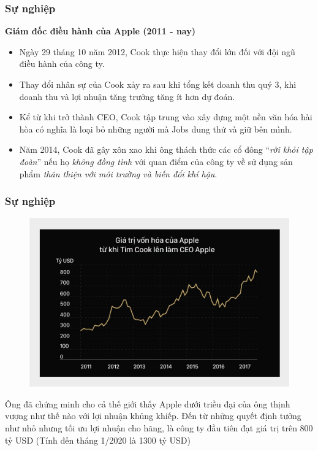 \documentclass[10pt]{beamer}
\begin{document}
\begin{frame}
\transblindshorizontal
\frametitle{Sự nghiệp}

\pause
\textbf{Giám đốc điều hành của Apple (2011 - nay)}
\begin{itemize}
\item Ngày 29 tháng 10 năm 2012, Cook thực hiện thay đổi lớn đối với đội ngũ điều hành của công ty.
\item Thay đổi nhân sự của Cook xảy ra sau khi tổng kết doanh thu quý 3, khi doanh thu và lợi nhuận tăng trưởng tăng ít hơn dự đoán.
\item Kể từ khi trở thành CEO, Cook tập trung vào xây dựng một nền văn hóa hài hòa có nghĩa là loại bỏ những người mà Jobs dung thứ và giữ bên mình.
\item Năm 2014, Cook đã gây xôn xao khi ông thách thức các cổ đông ``\emph{rời khỏi tập đoàn}'' nếu họ \emph{không đồng tình} với quan điểm của công ty về sử dụng sản phẩm \emph{thân thiện với môi trường và biến đổi khí hậu}.
\end{itemize}
\end{frame}

\begin{frame}
\transsplitverticalin
\frametitle{Sự nghiệp}
\begin{figure}
\includegraphics[scale=0.2]{Figs/vonhoa.jpg}
\end{figure}

Ông đã chứng minh cho cả thế giới thấy Apple dưới triều đại của ông thịnh vượng như thế nào với lợi nhuận khủng khiếp. Đến từ những quyết định tưởng như nhỏ nhưng tối ưu lợi nhuận cho hãng, là công ty đầu tiên đạt giá trị trên 800 tỷ USD (Tính đến tháng 1/2020 là 1300 tỷ USD)
\end{frame}
\end{document}

